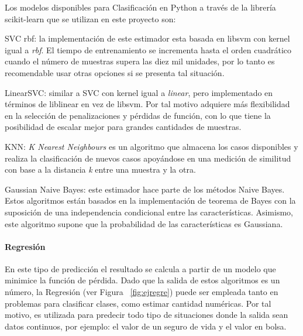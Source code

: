 Los modelos disponibles para Clasificación en Python a través de la librería scikit-learn \parencite{sklearn_api} que se utilizan en este proyecto son:

\begin{APAitemize}
    \item SVC rbf: la implementación de este estimador esta basada en libsvm con kernel igual a \textit{rbf}. El tiempo de entrenamiento se incrementa hasta el orden cuadrático cuando el número de muestras supera las diez mil unidades, por lo tanto es recomendable usar otras opciones si se presenta tal situación.
    \item LinearSVC: similar a SVC con kernel igual a \textit{linear}, pero implementado en términos de liblinear en vez de libsvm. Por tal motivo adquiere más flexibilidad en la selección de penalizaciones y pérdidas de función, con lo que tiene la posibilidad de escalar mejor para grandes cantidades de muestras.
    \item KNN: \textit{K Nearest Neighbours} es un algoritmo que almacena los casos disponibles y realiza la clasificación de nuevos casos apoyándose en una medición de similitud con base a la distancia \textit{k} entre una muestra y la otra.
    \item Gaussian Naive Bayes: este estimador hace parte de los métodos Naive Bayes. Estos algoritmos están basados en la implementación de teorema de Bayes con la suposición de una independencia condicional entre las características. Asimismo, este algoritmo supone que la probabilidad de las características es Gaussiana.
\end{APAitemize}

\paragraph{Regresión} En este tipo de predicción el resultado se calcula a partir de un modelo que minimice la función de pérdida. Dado que la salida de estos algoritmos es un número, la Regresión (ver Figura ~\ref{fig:ejregre}) puede ser empleada tanto en problemas para clasificar clases, como estimar cantidad numéricas. Por tal motivo, es utilizada para predecir todo tipo de situaciones donde la salida sean datos continuos, por ejemplo: el valor de un seguro de vida y el valor en bolsa. 

